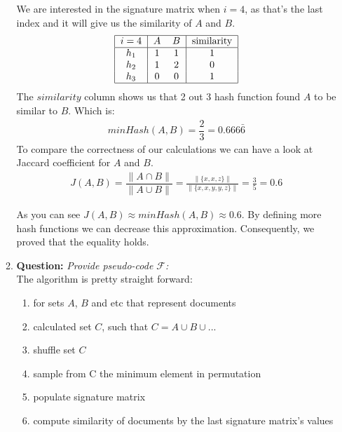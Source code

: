 \documentclass[11pt,a4paper,english]{article}
\begin{document}
\begin{enumerate}
\begin{enumerate}
            We are interested in the signature matrix when $i=4$, as that's the last index and it will give us the similarity of $A$ and $B$.
            \begin{align*}
              \begin{tabular}{|c | c c | c | }\hline
                $i=4$ & $A$ & $B$ & similarity\\ \hline
                $h_1$ &  1  &  1  & 1\\
                $h_2$ &  1  &  2  & 0\\
                $h_3$ &  0  &  0  & 1\\  \hline
              \end{tabular}
            \end{align*}
            The $similarity$ column shows us that 2 out 3 hash function found $A$ to be similar to $B$. Which is:
            \begin{align*}
              minHash(A,B) = \dfrac{2}{3} = 0.666\bar{6}
            \end{align*}
            To compare the correctness of our calculations we can have a look at Jaccard coefficient for $A$ and $B$.
            \begin{align*}
              J(A,B) = \dfrac{\| A \cap B \|}{\| A \cup B \|} =
              \frac{ \| \{ x,x,z\} \| }{ \| \{ x,x,y,y,z \} \| } = \frac{3}{5} = 0.6
            \end{align*}

            As you can see $J(A,B) \approx minHash(A,B) \approx 0.6$. By defining more hash functions we can decrease this approximation. Consequently, we proved that the equality holds.

          \item \textbf{Question:} \textit{Provide pseudo-code $\mathcal{F}$:}\\
            The algorithm is pretty straight forward:
            \begin{enumerate}
              \item for sets $A$, $B$ and etc that represent documents
              \item calculated set $C$, such that $C = A \cup B \cup ...$
              \item shuffle set $C$
              \item sample from C the minimum element in permutation
              \item populate signature matrix
              \item compute similarity of documents by the last signature matrix's values
            \end{enumerate}


\end{enumerate}
\end{enumerate}
\end{document}
